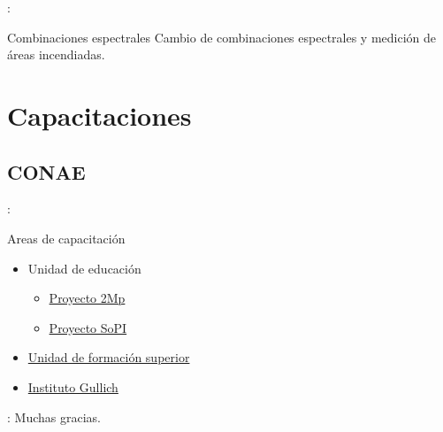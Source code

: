 \documentclass[]{beamer}
\begin{document}
\begin{frame}{\secname : \subsecname}
    \begin{alertblock}{Combinaciones espectrales}
        Cambio de combinaciones espectrales y medición de áreas incendiadas.
    \end{alertblock}
\end{frame}

\section{Capacitaciones}
\subsection{CONAE}
\begin{frame}{\secname : \subsecname}
    \begin{block}{Areas de capacitación}
    \begin{itemize}
        \item Unidad de educación
        \begin{itemize}
            \item \href{https://2mp.conae.gov.ar}{Proyecto 2Mp}
            \item \href{https://sopi.conae.gov.ar}{Proyecto SoPI}
        \end{itemize}
        \item \href{http://ufs.conae.gov.ar/}{Unidad de formación superior}
        \item \href{http://ig.edu.ar/}{Instituto Gullich}
    \end{itemize}
    \end{block}
\end{frame}

\begin{frame}{\secname : \subsecname}
    Muchas gracias.
\end{frame}
\end{document}
